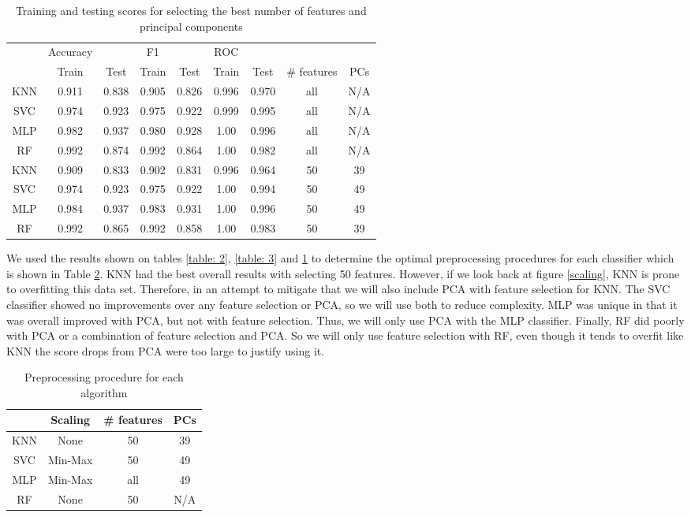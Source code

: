 \documentclass[12pt]{article}
\begin{document}
\begin{table}[h!]
	\centering
	\begin{tabular}{| c|cc| cc| cc|cc|} 
		\hline
		&Accuracy&&F1&&ROC&&&\\
		& Train & Test & Train & Test & Train & Test & \# features& PCs\\ \hline
		KNN & 0.911 & 0.838 & 0.905 & 0.826 & 0.996& 0.970& all& N/A\\ 
		SVC & 0.974 & 0.923 & 0.975 & 0.922 & 0.999 & 0.995& all& N/A\\ 
		MLP & 0.982 & 0.937 & 0.980 & 0.928 & 1.00 & 0.996& all& N/A\\
		RF  & 0.992 & 0.874 & 0.992 & 0.864 & 1.00 & 0.982& all& N/A\\
		\hline
		KNN & 0.909 & 0.833 & 0.902 & 0.831 & 0.996& 0.964& 50&39\\ 
		SVC & 0.974 & 0.923 & 0.975 & 0.922 & 1.00 & 0.994& 50&49\\ 
		MLP & 0.984 & 0.937 & 0.983 & 0.931 & 1.00 & 0.996& 50&49\\
		RF  & 0.992 & 0.865 & 0.992 & 0.858 & 1.00 & 0.983& 50&39\\
		\hline
	\end{tabular}
	\caption{Training and testing scores for selecting the best number of features and  principal components}
	\label{table: 4}
\end{table}


We used the results shown on tables \ref{table: 2}, \ref{table: 3} and \ref{table: 4} to determine the optimal preprocessing procedures for each classifier which is shown in Table \ref{table: 5}. KNN had the best overall results with selecting 50 features. However, if we look back at figure \ref{scaling}, KNN is prone to overfitting this data set. Therefore, in an attempt to mitigate that we will also include PCA with feature selection for KNN. The SVC classifier showed no improvements over any feature selection or PCA, so we will use both to reduce complexity. MLP was unique in that it was overall improved with PCA, but not with feature selection. Thus, we will only use PCA with the MLP classifier. Finally, RF did poorly with PCA or a combination of feature selection and PCA. So we will only use feature selection with RF, even though it tends to overfit like KNN the score drops from PCA were too large to justify using it.

\begin{table}[h!]
	\centering
	\begin{tabular}{| c|ccc|} 
		\hline
		& Scaling & \# features& PCs\\ \hline
		KNN & None & 50 &39\\ 
		SVC & Min-Max & 50 & 49\\ 
		MLP & Min-Max & all & 49\\
		RF  & None & 50 & N/A\\
		\hline
	\end{tabular}
	\caption{Preprocessing procedure for each algorithm}
	\label{table: 5}
\end{table}
\end{document}
